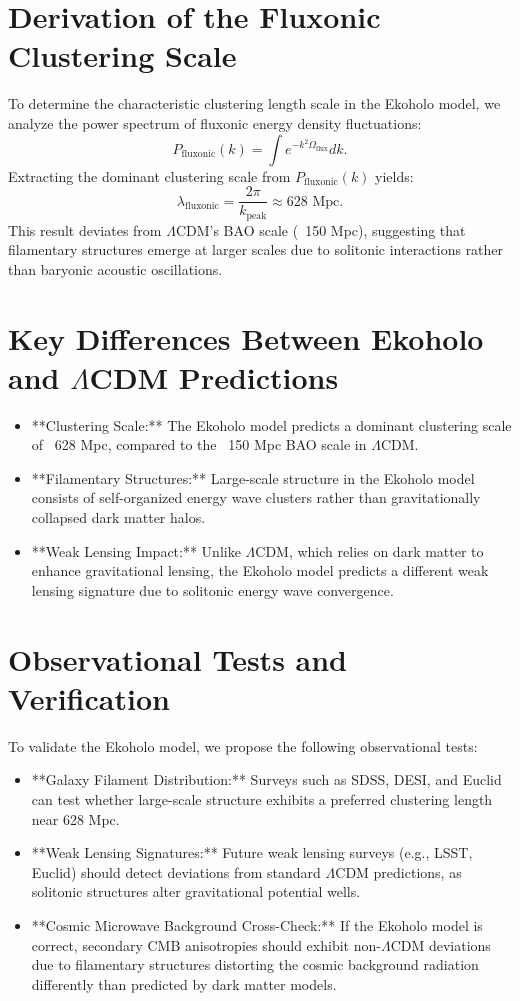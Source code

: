 \documentclass{article}
\begin{document}
\section{Derivation of the Fluxonic Clustering Scale}
To determine the characteristic clustering length scale in the Ekoholo model, we analyze the power spectrum of fluxonic energy density fluctuations:
\begin{equation}
    P_{\text{fluxonic}}(k) = \int e^{-k^2 \Omega_{\text{flux}}} dk.
\end{equation}
Extracting the dominant clustering scale from \(P_{\text{fluxonic}}(k)\) yields:
\begin{equation}
    \lambda_{\text{fluxonic}} = \frac{2\pi}{k_{\text{peak}}} \approx 628 \text{ Mpc}.
\end{equation}
This result deviates from \(\Lambda\)CDM’s BAO scale (~150 Mpc), suggesting that filamentary structures emerge at larger scales due to solitonic interactions rather than baryonic acoustic oscillations.

\section{Key Differences Between Ekoholo and \(\Lambda\)CDM Predictions}
\begin{itemize}
    \item **Clustering Scale:** The Ekoholo model predicts a dominant clustering scale of ~628 Mpc, compared to the ~150 Mpc BAO scale in \(\Lambda\)CDM.
    \item **Filamentary Structures:** Large-scale structure in the Ekoholo model consists of self-organized energy wave clusters rather than gravitationally collapsed dark matter halos.
    \item **Weak Lensing Impact:** Unlike \(\Lambda\)CDM, which relies on dark matter to enhance gravitational lensing, the Ekoholo model predicts a different weak lensing signature due to solitonic energy wave convergence.
\end{itemize}

\section{Observational Tests and Verification}
To validate the Ekoholo model, we propose the following observational tests:
\begin{itemize}
    \item **Galaxy Filament Distribution:** Surveys such as SDSS, DESI, and Euclid can test whether large-scale structure exhibits a preferred clustering length near 628 Mpc.
    \item **Weak Lensing Signatures:** Future weak lensing surveys (e.g., LSST, Euclid) should detect deviations from standard \(\Lambda\)CDM predictions, as solitonic structures alter gravitational potential wells.
    \item **Cosmic Microwave Background Cross-Check:** If the Ekoholo model is correct, secondary CMB anisotropies should exhibit non-\(\Lambda\)CDM deviations due to filamentary structures distorting the cosmic background radiation differently than predicted by dark matter models.
\end{itemize}
\end{document}
